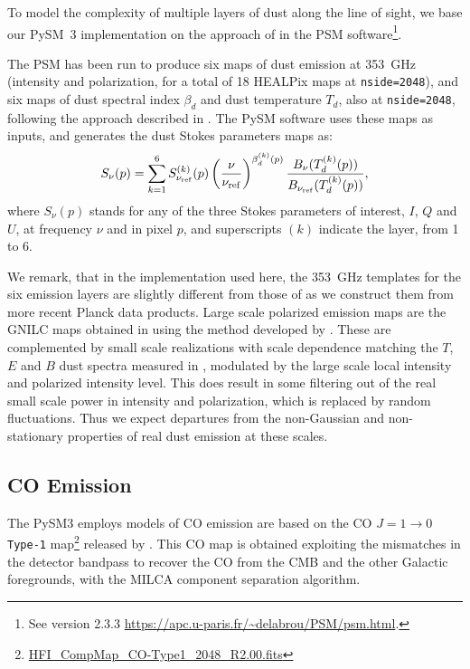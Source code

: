 \documentclass[twocolumn]{aastex631}
\begin{document}
To model the complexity of multiple layers of dust along the line of sight, we base our  PySM~3 implementation  on the approach of \cite{Martinez-Solaeche:2018} in the PSM software\footnote{See version 2.3.3 \url{https://apc.u-paris.fr/~delabrou/PSM/psm.html}.}. 

The PSM has been run to produce six maps of dust emission at 353~GHz (intensity and polarization, for a total of 18 HEALPix maps at {\tt nside=2048}), and six maps of dust spectral index $\beta_d$ and dust temperature $T_d$, also at {\tt nside=2048}, following the approach described in \cite{Martinez-Solaeche:2018}. The PySM software uses these maps as inputs, and generates the dust Stokes parameters maps as:
\begin{equation}
    S_\nu(p) = \sum_{k=1}^6 S^{(k)}_{\nu_{\rm ref}}(p)
    \left( \frac{\nu}{\nu_{\rm ref}} \right)^{\beta^{(k)}_d(p)}
    \frac{B_\nu(T^{(k)}_d(p))}{B_{\nu_{\rm ref}}(T^{(k)}_d(p))},
\end{equation}
where $S_\nu(p)$ stands for any of the three Stokes parameters of interest, $I$, $Q$ and $U$, at frequency $\nu$ and in pixel $p$, and superscripts ${(k)}$ indicate the layer, from 1 to 6.

We remark, that in the implementation used here, the 353~GHz templates for the six emission layers are slightly different from those of \cite{Martinez-Solaeche:2018} as we construct them from more recent Planck data products. Large scale polarized emission maps are the GNILC maps obtained in \cite{planck2016-l04} using the method developed by \cite{Remazeilles:2011}. These are complemented by small scale realizations with scale dependence matching the $T$, $E$ and $B$ dust spectra measured in \cite{planck2016-l11A}, modulated by the large scale local intensity and polarized intensity level. This does result in some filtering out of the real small scale power in intensity and polarization, which is replaced by random fluctuations. Thus we expect departures from the non-Gaussian and non-stationary properties of real dust emission at these scales. %

\subsection{CO Emission} \label{subsec:co_models}

The PySM3 employs models of CO emission  are based on   the CO $J = 1\rightarrow0$ \texttt{Type-1} map\footnote{\url{HFI_CompMap_CO-Type1_2048_R2.00.fits}} released by \citet{planck2013-p03a}.  This CO map is obtained exploiting the mismatches in the detector bandpass to recover the CO from the CMB and the other Galactic foregrounds, with the MILCA component separation algorithm.  
\end{document}
